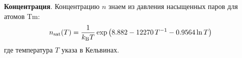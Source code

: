 \textbf{Концентрация}.  Концентрацию $n$ знаем из давления насыщенных паров \cite{svp} для атомов Tm:
\begin{equation}
	n_{\textnormal{sat}}(T) = \frac{1}{k_{\textnormal{B}} T} \exp\left(
		8.882 - 12270\, T^{-1} - 0.9564 \ln T
	\right)
	\label{nTp}
\end{equation}
где температура $T$ указа в Кельвинах.
